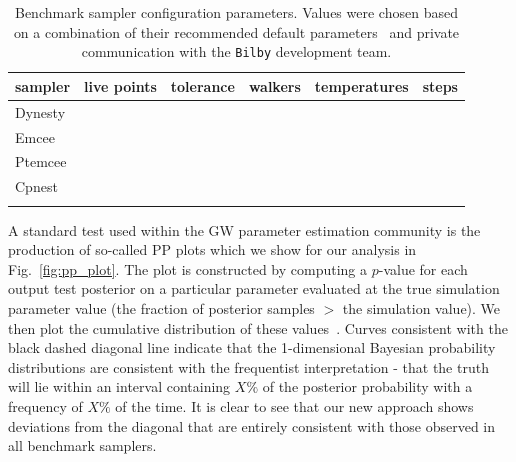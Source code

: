 \documentclass[%
showpacs,
 amsmath,amssymb,
 aps,
 twocolumn,
 prl,
 reprint,
floatfix,
]{revtex4-1}
\newcommand{\chris}[1]{\textbf{\textcolor{red}{CHRIS: #1}}}
\begin{document}
%
%
\begin{table}
\centering
\caption{Benchmark sampler configuration parameters. Values were chosen based
on a combination of their recommended default parameters~\cite{1811.02042} and
private communication with the \texttt{Bilby} development team.}
\begin{tabular}[t]{lccccc}
\toprule
sampler & live points & tolerance & walkers & temperatures & steps \\
\hline
Dynesty & & & & & \\
Emcee & & & & &\\
Ptemcee & & & & & \\
Cpnest & & & & & \\
\botrule
\end{tabular}
\label{Tab:sampler_params}
\end{table}

%
%
A standard test used within the \ac{GW} parameter estimation community is the
production of so-called \ac{PP} plots which we show for our analysis in
Fig.~\ref{fig:pp_plot}. The plot is constructed by computing a $p$-value for each
output test posterior on a particular parameter evaluated at the true
simulation parameter value (the fraction of posterior samples $>$ the
simulation value). We then plot the cumulative distribution of these
values~\cite{1409.7215}. Curves consistent with the black dashed diagonal line
indicate that the 1-dimensional Bayesian probability distributions are
consistent with the frequentist interpretation - that the truth will lie within
an interval containing $X\%$ of the posterior probability with a frequency of
$X\%$ of the time. It is clear to see that our new approach shows deviations
from the diagonal that are entirely consistent with those observed in all
benchmark samplers. 
\end{document}
